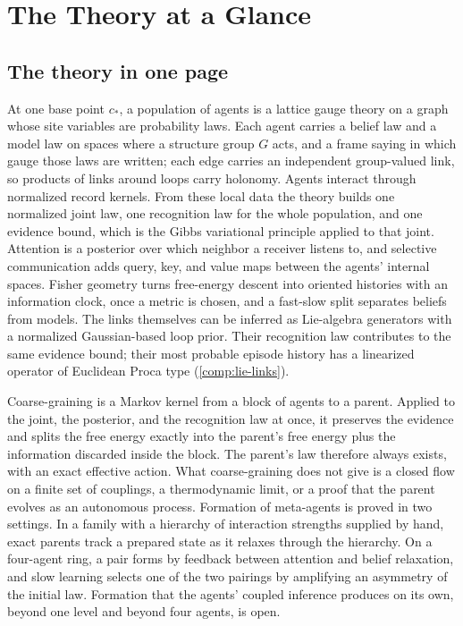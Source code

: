 \chapter*{The Theory at a Glance}
\label{comp:glance}

\section*{The theory in one page}

At one base point $c_*$, a population of agents is a lattice gauge theory on a graph whose site
variables are probability laws. Each agent carries a belief law and a model law on spaces where a
structure group $G$ acts, and a frame saying in which gauge those laws are written; each edge carries
an independent group-valued link, so products of links around loops carry holonomy. Agents interact
through normalized record kernels. From these local data the theory builds one normalized joint law,
one recognition law for the whole population, and one evidence bound, which is the Gibbs variational
principle applied to that joint. Attention is a posterior over which neighbor a receiver listens to,
and selective communication adds query, key, and value maps between the agents' internal spaces.
Fisher geometry turns free-energy descent into oriented histories with an information clock, once a
metric is chosen, and a fast-slow split separates beliefs from models. The links themselves can be
inferred as Lie-algebra generators with a normalized Gaussian-based loop prior. Their recognition
law contributes to the same evidence bound; their most probable episode history has a linearized
operator of Euclidean Proca type (\cref{comp:lie-links}).

Coarse-graining is a Markov kernel from a block of agents to a parent. Applied to the joint, the
posterior, and the recognition law at once, it preserves the evidence and splits the free energy
exactly into the parent's free energy plus the information discarded inside the block. The parent's
law therefore always exists, with an exact effective action. What coarse-graining does not give is a
closed flow on a finite set of couplings, a thermodynamic limit, or a proof that the parent evolves as
an autonomous process. Formation of meta-agents is proved in two settings. In a family with a
hierarchy of interaction strengths supplied by hand, exact parents track a prepared state as it
relaxes through the hierarchy. On a four-agent ring, a pair forms by feedback between attention and
belief relaxation, and slow learning selects one of the two pairings by amplifying an asymmetry of
the initial law. Formation that the agents' coupled inference produces on its own, beyond one level
and beyond four agents, is open.

